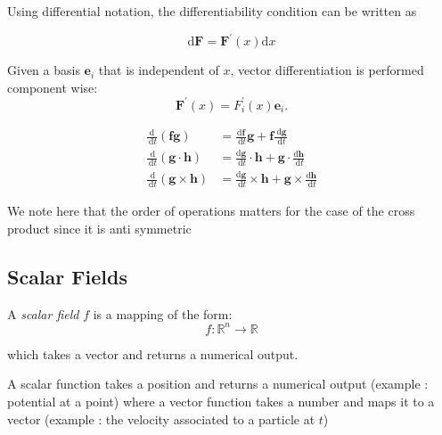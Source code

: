 \begin{nprop}
	Using differential notation, the differentiability condition can be written as
	
	$$
	\mathrm{d} \mathbf{F}=\mathbf{F}^{\prime}(x) \mathrm{d} x
	$$
	
	
	Given a basis $\mathbf{e}_i$ that is independent of $x$, vector differentiation is performed component wise:
	$$
	\mathbf{F}^{\prime}(x)=F_i^{\prime}(x) \mathbf{e}_i .
	$$
\end{nprop}

\begin{nprop}
	$$
	\begin{aligned}
		\frac{\mathrm{d}}{\mathrm{~d} t}(\mathbf{f} \mathbf{g}) & =\frac{\mathrm{d} \mathbf{f}}{\mathrm{~d} t} \mathbf{g}+\mathbf{f} \frac{\mathrm{~d} \mathbf{g}}{\mathrm{~d} t} \\
		\frac{\mathrm{~d}}{\mathrm{~d} t}(\mathbf{g} \cdot \mathbf{h}) & =\frac{\mathrm{d} \mathbf{g}}{\mathrm{~d} t} \cdot \mathbf{h}+\mathbf{g} \cdot \frac{\mathrm{d} \mathbf{h}}{\mathrm{~d} t} \\
		\frac{\mathrm{~d}}{\mathrm{~d} t}(\mathbf{g} \times \mathbf{h}) & =\frac{\mathrm{d} \mathbf{g}}{\mathrm{~d} t} \times \mathbf{h}+\mathbf{g} \times \frac{\mathrm{d} \mathbf{h}}{\mathrm{~d} t}
	\end{aligned}
	$$
	
	We note here that the order of operations matters for the case of the cross product since it is anti symmetric
\end{nprop}

\subsection{Scalar Fields}

\begin{ndefi}
	A  \emph{scalar field} $f$ is a mapping of the form:
	$$
	f: \mathbb{R}^n \rightarrow \mathbb{R}
	$$
	
	which takes a vector and returns a numerical output.
\end{ndefi}

\begin{nrem}
	A scalar function takes a position and returns a numerical output (example : potential at a point) where a vector function takes a number and maps it to a vector (example :  the velocity associated to a particle at $t$)
\end{nrem}

